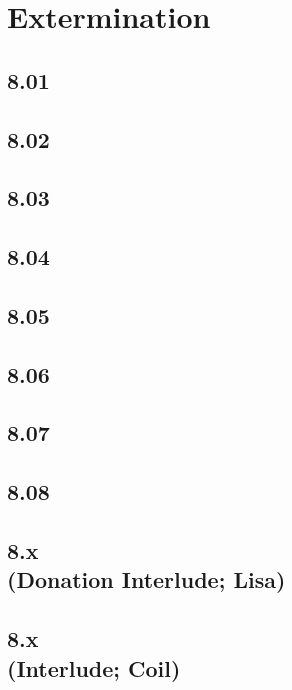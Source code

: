 \part{Extermination}

 \chapter{8.01}

 \chapter{8.02}

 \chapter{8.03}

 \chapter{8.04}

 \chapter{8.05}

 \chapter{8.06}

 \chapter{8.07}

 \chapter{8.08}

 \chapter[8.x (Donation Interlude; Lisa)]{8.x\\(Donation Interlude; Lisa)}

 \chapter[8.x (Interlude; Coil)]{8.x\\(Interlude; Coil)}











